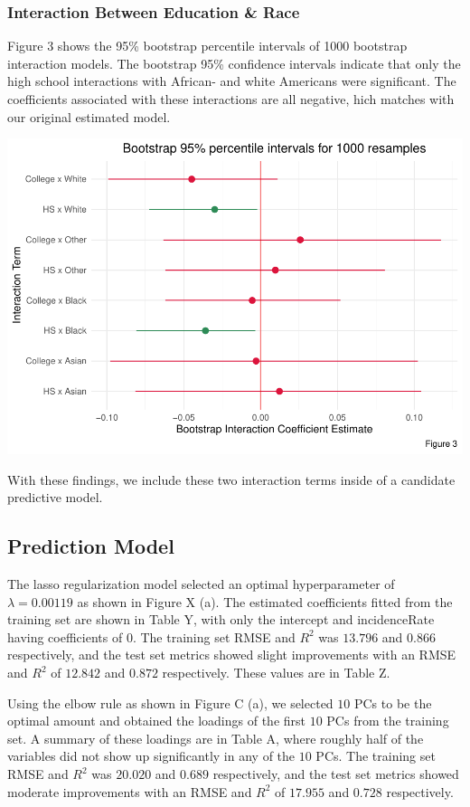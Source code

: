 \documentclass[
  11pt,
]{article}
\begin{document}
\hypertarget{interaction-between-education-race}{%
\subsubsection{Interaction Between Education \&
Race}\label{interaction-between-education-race}}

Figure 3 shows the 95\% bootstrap percentile intervals of 1000 bootstrap
interaction models. The bootstrap 95\% confidence intervals indicate
that only the high school interactions with African- and white Americans
were significant. The coefficients associated with these interactions
are all negative, hich matches with our original estimated model.

\begin{center}\includegraphics[width=0.7\linewidth]{report_files/figure-latex/bootstrap_table-1} \end{center}

With these findings, we include these two interaction terms inside of a
candidate predictive model.

\hypertarget{prediction-model-1}{%
\subsection{Prediction Model}\label{prediction-model-1}}

The lasso regularization model selected an optimal hyperparameter of
\(\lambda = 0.00119\) as shown in Figure X (a). The estimated
coefficients fitted from the training set are shown in Table Y, with
only the intercept and incidenceRate having coefficients of \(0\). The
training set RMSE and \(R^2\) was \(13.796\) and \(0.866\) respectively,
and the test set metrics showed slight improvements with an RMSE and
\(R^2\) of \(12.842\) and \(0.872\) respectively. These values are in
Table Z.

Using the elbow rule as shown in Figure C (a), we selected \(10\) PCs to
be the optimal amount and obtained the loadings of the first \(10\) PCs
from the training set. A summary of these loadings are in Table A, where
roughly half of the variables did not show up significantly in any of
the \(10\) PCs. The training set RMSE and \(R^2\) was \(20.020\) and
\(0.689\) respectively, and the test set metrics showed moderate
improvements with an RMSE and \(R^2\) of \(17.955\) and \(0.728\)
respectively.
\end{document}
